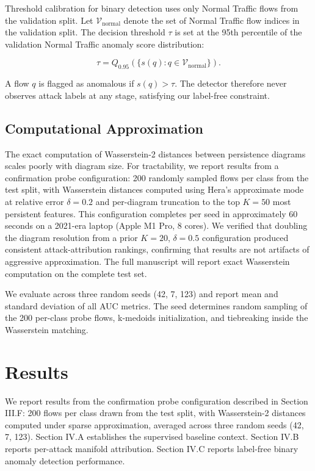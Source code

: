\documentclass[conf]{new-aiaa}
\begin{document}
Threshold calibration for binary detection uses only Normal Traffic flows from the validation split. Let $\mathcal{V}_{\text{normal}}$ denote the set of Normal Traffic flow indices in the validation split. The decision threshold $\tau$ is set at the 95th percentile of the validation Normal Traffic anomaly score distribution:

\begin{equation}
\tau = Q_{0.95}\!\left( \{ s(q) : q \in \mathcal{V}_{\text{normal}} \} \right).
\label{eq:threshold}
\end{equation}

A flow $q$ is flagged as anomalous if $s(q) > \tau$. The detector therefore never observes attack labels at any stage, satisfying our label-free constraint.

\subsection{Computational Approximation}

The exact computation of Wasserstein-2 distances between persistence diagrams scales poorly with diagram size. For tractability, we report results from a confirmation probe configuration: 200 randomly sampled flows per class from the test split, with Wasserstein distances computed using Hera's approximate mode at relative error $\delta = 0.2$ and per-diagram truncation to the top $K = 50$ most persistent features. This configuration completes per seed in approximately 60 seconds on a 2021-era laptop (Apple M1 Pro, 8 cores). We verified that doubling the diagram resolution from a prior $K = 20$, $\delta = 0.5$ configuration produced consistent attack-attribution rankings, confirming that results are not artifacts of aggressive approximation. The full manuscript will report exact Wasserstein computation on the complete test set.

We evaluate across three random seeds (42, 7, 123) and report mean and standard deviation of all AUC metrics. The seed determines random sampling of the 200 per-class probe flows, k-medoids initialization, and tiebreaking inside the Wasserstein matching.

\section{Results}

We report results from the confirmation probe configuration described in Section III.F: 200 flows per class drawn from the test split, with Wasserstein-2 distances computed under sparse approximation, averaged across three random seeds (42, 7, 123). Section IV.A establishes the supervised baseline context. Section IV.B reports per-attack manifold attribution. Section IV.C reports label-free binary anomaly detection performance.
\end{document}
